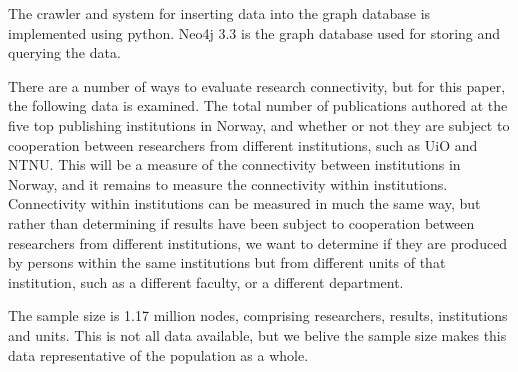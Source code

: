 The crawler and system for inserting data into the graph database is implemented using python.
Neo4j 3.3 is the graph database used for storing and querying the data.


There are a number of ways to evaluate research connectivity, but for this paper, the following data is examined.
The total number of publications authored at the five top publishing institutions in Norway, and whether or not they are subject to cooperation between researchers from different institutions, such as UiO and NTNU.
This will be a measure of the connectivity between institutions in Norway, and it remains to measure the connectivity within institutions.
Connectivity within institutions can be measured in much the same way, but rather than determining if results have been subject to cooperation between researchers from different institutions, we want to determine if they are produced by persons within the same institutions but from different units of that institution, such as a different faculty, or a different department.

The sample size is 1.17 million nodes, comprising researchers, results, institutions and units. This is not all data available, but we belive the sample size makes this data representative of the population as a whole.
